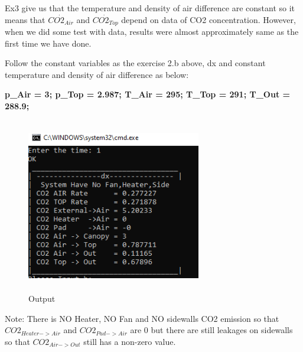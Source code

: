 Ex3 give us that the temperature and density of air difference are constant so it means that $\Dot{CO2_{Air}}$ and $\Dot{CO2_{Top}}$ depend on data of CO2 concentration. However, when we did some test with data, results were almost approximately same as the first time we have done.

Follow the constant variables as the exercise 2.b above, dx and constant temperature and density of air difference as below:

\textbf{
p\_Air = 3;
p\_Top = 2.987;
T\_Air = 295;
T\_Top = 291;
T\_Out = 288.9;
}

\begin{figure}[h]
\centering
    \includegraphics[width = 3in, height = 3in]{Code/Pic/result.png}
    \caption{Output}
    \label{fig:my_label}
\end{figure}

Note: There is NO Heater, NO Fan and NO sidewalls CO2 emission so that $CO2_{Heater->Air}$ and  $CO2_{Pad->Air}$ are 0 but there are still leakages on sidewalls so that $CO2_{Air->Out}$ still has a non-zero value.

